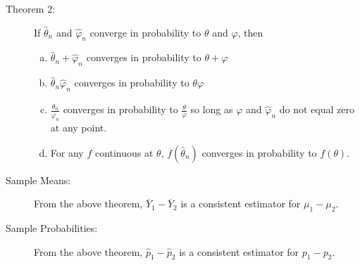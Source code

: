 \documentclass[10pt]{extarticle}
\begin{document}
  \begin{description}
    \item[Theorem 2:] If $\hat{\theta}_n$ and $\hat{\varphi}_n$ converge in probability to $\theta$ and $\varphi$, then 
      \begin{enumerate}[(a)]
        \item $\hat{\theta}_n + \hat{\varphi}_n$ converges in probability to $\theta + \varphi$
        \item $\hat{\theta}_n\hat{\varphi}_n$ converges in probability to $\theta\varphi$
        \item $\frac{\hat{\theta}_n}{\hat{\varphi}_n}$ converges in probability to $\frac{\theta}{\varphi}$ so long as $\varphi$ and $\hat{\varphi}_n$ do not equal zero at any point.
        \item For any $f$ continuous at $\theta$, $f(\hat{\theta}_n)$ converges in probability to $f(\theta)$.
      \end{enumerate}
  \end{description}
  \begin{description}
    \item[Sample Means:] From the above theorem, $\overline{Y}_1 - \overline{Y}_2$ is a consistent estimator for $\mu_1 - \mu_2$.
    \item[Sample Probabilities:] From the above theorem, $\hat{p}_1 - \hat{p}_2$ is a consistent estimator for $p_1-p_2$.
  \end{description}
\end{document}
